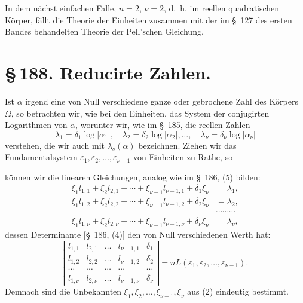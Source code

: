 \documentclass[11pt]{article}
\begin{document}
In dem nächst einfachen Falle, $n=2$, $\nu=2$, d.~h. im reellen quadratischen Körper, fällt die Theorie der Einheiten zusammen mit der im \S~127 des ersten Bandes behandelten Theorie der Pell'schen Gleichung.

\clearpage
\section*{\S\,188. Reducirte Zahlen.}

Ist $\alpha$ irgend eine von Null verschiedene ganze oder gebrochene Zahl des Körpers $\Omega$, so betrachten wir, wie bei den Einheiten, das System der conjugirten Logarithmen von $\alpha$, worunter wir, wie im \S~185, die reellen Zahlen
\begin{equation}
\lambda_1=\delta_1\log|\alpha_1|,\quad
\lambda_2=\delta_2\log|\alpha_2|,\ldots,\quad
\lambda_\nu=\delta_\nu\log|\alpha_\nu|
\tag{1}
\end{equation}
verstehen, die wir auch mit $\lambda_s(\alpha)$ bezeichnen. Ziehen wir das Fundamentalsystem $\varepsilon_1,\varepsilon_2,\ldots,\varepsilon_{\nu-1}$ von Einheiten zu Rathe, so

können wir die linearen Gleichungen, analog wie im \S~186, (5) bilden:
\begin{equation}
\begin{aligned}
\xi_1l_{1,1}+\xi_2l_{2,1}+\cdots+\xi_{\nu-1}l_{\nu-1,1}+\delta_1\xi_\nu&=\lambda_1,\\
\xi_1l_{1,2}+\xi_2l_{2,2}+\cdots+\xi_{\nu-1}l_{\nu-1,2}+\delta_2\xi_\nu&=\lambda_2,\\
&\cdots\cdots\cdots\\
\xi_1l_{1,\nu}+\xi_2l_{2,\nu}+\cdots+\xi_{\nu-1}l_{\nu-1,\nu}+\delta_\nu\xi_\nu&=\lambda_\nu,
\end{aligned}
\tag{2}
\end{equation}
dessen Determinante [\S~186, (4)] den von Null verschiedenen Werth hat:
\begin{equation}
\left|
\begin{array}{ccccc}
l_{1,1}&l_{2,1}&\ldots&l_{\nu-1,1}&\delta_1\\
l_{1,2}&l_{2,2}&\ldots&l_{\nu-1,2}&\delta_2\\
\cdots&\cdots&\cdots&\cdots&\cdots\\
l_{1,\nu}&l_{2,\nu}&\ldots&l_{\nu-1,\nu}&\delta_\nu
\end{array}
\right|=nL(\varepsilon_1,\varepsilon_2,\ldots,\varepsilon_{\nu-1}).
\tag{3}
\end{equation}
Demnach sind die Unbekannten $\xi_1,\xi_2,\ldots,\xi_{\nu-1},\xi_\nu$ aus (2) eindeutig bestimmt.
\end{document}
